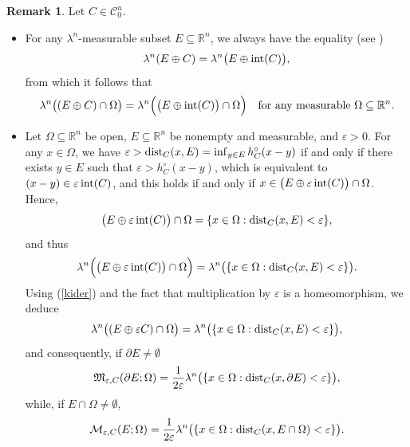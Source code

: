 \documentclass[pdflatex,sn-mathphys-num]{sn-jnl}
\theoremstyle{plain}
\theoremstyle{definition}
\newtheorem{rem}[theorem]{Remark}
\DeclareMathOperator{\inter}{\textup{int}}
\begin{document}
\begin{rem} 
Let $C\in\mathcal{C}^n_0$. 
\begin{itemize}
    \item For any $\lambda^n$-measurable subset $E\subseteq\mathbb{R}^n$, we always have the equality (see \cite[eq. (10)]{Rataj})
    \begin{align*}
        \lambda^n(E\oplus C)=\lambda^n\big(E\oplus \inter(C)\big),
    \end{align*}
    from which it follows that
    \begin{align}\label{kider}
        \lambda^n\big((E\oplus C)\cap\Omega\big)=\lambda^n\Big(\big(E\oplus \inter(C)\big)\cap\Omega\Big) \quad \text{for any measurable $\Omega\subseteq\mathbb{R}^n$.}
    \end{align}
    
    \item Let $\Omega\subseteq\mathbb{R}^n$ be open, $E\subseteq\mathbb{R}^n$ be nonempty and measurable, and $\varepsilon>0$. For any $x\in\Omega$, we have $\varepsilon>\textup{dist}_C(x, E)=\inf_{y\in E}h_C^{\circ}(x-y)$ if and only if there exists $y\in E$ such that $\varepsilon>h_C^{\circ}(x-y)$, which is equivalent to $(x-y)\in\varepsilon \inter(C)$, and this holds if and only if $x\in \big(E\oplus\varepsilon \inter(C)\big)\cap\Omega$. Hence,
    \begin{equation*}
        \big(E\oplus\varepsilon \inter(C)\big)\cap\Omega=\{x\in\Omega:\textup{dist}_C(x, E)<\varepsilon\},
    \end{equation*}
    and thus
    \begin{equation*}
        \lambda^n\Big(\big(E\oplus\varepsilon \inter(C)\big)\cap\Omega\Big)=\lambda^n\big(\{x\in\Omega:\textup{dist}_C(x, E)<\varepsilon\}\big).
    \end{equation*}
    Using (\ref{kider}) and the fact that multiplication by $\varepsilon$ is a homeomorphism, we deduce
    \begin{equation}
        \lambda^n\big((E\oplus\varepsilon C)\cap\Omega\big)=\lambda^n\big(\{x\in\Omega:\textup{dist}_C(x, E)<\varepsilon\}\big),
    \end{equation}
    and consequently, if $\partial E\neq\emptyset$
    \begin{align}\label{eq:54}
        \mathfrak{M}_{\varepsilon, C}(\partial E; \Omega)=\frac{1}{2\varepsilon}\lambda^n\big(\{x\in\Omega:\textup{dist}_C(x, \partial E)<\varepsilon\}\big),
    \end{align}
    while, if $E\cap\Omega\neq\emptyset$,
    \begin{align*}
        \mathcal{M}_{\varepsilon, C}(E; \Omega)=\frac{1}{2\varepsilon}\lambda^n\big(\{x\in\Omega:\textup{dist}_C(x, E\cap\Omega)<\varepsilon\}\big).
    \end{align*}


\end{itemize}
\end{rem}
\end{document}
